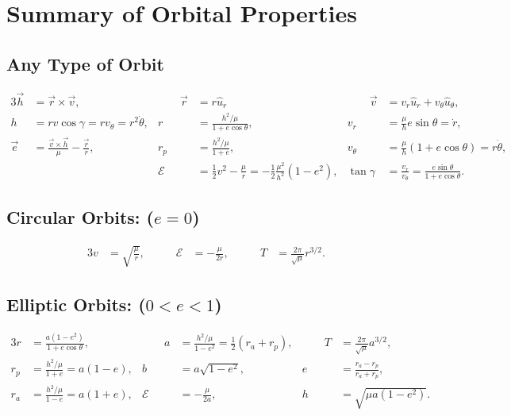 \documentclass[10pt]{article}
\date{}
\theoremstyle{plain}\theorembodyfont{\normalfont}
\begin{document}
\section*{Summary of Orbital Properties}
\pagestyle{empty}
\subsection*{Any Type of Orbit}

\begin{alignat*}{3}
\vec h & = \vec r \times \vec v,&\qquad 
\vec r & = r \hat u_r&\qquad
\vec v & = v_r \hat u_r + v_\theta \hat u_\theta,\\
h & = rv\cos\gamma = rv_\theta = r^2\dot\theta, &
r & = \frac{h^2/\mu}{1+e \cos\theta}, &
v_r & = \frac{\mu}{h}e\sin\theta = \dot r,\\
\vec e & = \frac{\vec v\times\vec h}{\mu}- \frac{\vec r}{r}, &
r_p & = \frac{h^2/\mu}{1+e}, &
v_\theta & = \frac{\mu}{h}(1+e\cos\theta) = r\dot\theta,\\
&&
\mathcal{E} & = \frac{1}{2} v^2 - \frac{\mu}{r} = -\frac{1}{2}\frac{\mu^2}{h^2}(1-e^2),&
\tan \gamma & = \frac{v_r}{v_\theta} = \frac{e\sin\theta}{1+e\cos\theta}.
\end{alignat*}

\subsection*{Circular Orbits: ($e=0$)}

\begin{alignat*}{3}
v & = \sqrt{\frac{\mu}{r}},&\qquad
\mathcal{E} & = -\frac{\mu}{2r},&\qquad
T & = \frac{2\pi}{\sqrt{\mu}} r^{3/2}.
\end{alignat*}

\subsection*{Elliptic Orbits: ($0<e<1$)}

\begin{alignat*}{3}
r & = \frac{a(1-e^2)}{1+e\cos\theta},&\qquad
a & = \frac{h^2/\mu}{1-e^2} =\frac{1}{2}(r_a+r_p),&\qquad
T & = \frac{2\pi}{\sqrt{\mu}} a^{3/2},\\
r_p & = \frac{h^2/\mu}{1+e} = a(1-e),&
b & = a \sqrt{1-e^2},&
e & = \frac{r_a-r_p}{r_a+r_p},\\
r_a & = \frac{h^2/\mu}{1-e} = a (1+e),&
\mathcal{E} & = -\frac{\mu}{2a},&
h & = \sqrt{\mu a(1-e^2)}.
\end{alignat*}
\end{document}
